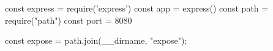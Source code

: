 const express = require('express')
const app = express()
const path = require("path")
const port = 8080

const expose = path.join(__dirname, "expose");